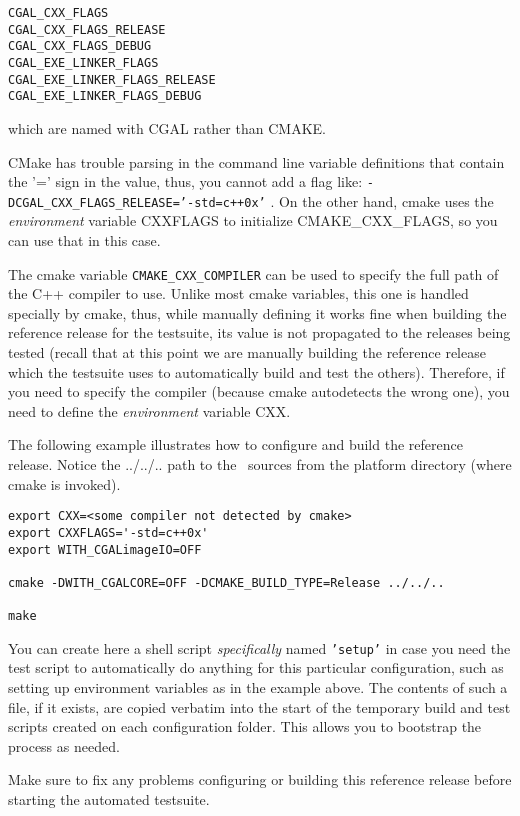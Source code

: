 \begin{verbatim}
CGAL_CXX_FLAGS
CGAL_CXX_FLAGS_RELEASE
CGAL_CXX_FLAGS_DEBUG
CGAL_EXE_LINKER_FLAGS
CGAL_EXE_LINKER_FLAGS_RELEASE
CGAL_EXE_LINKER_FLAGS_DEBUG
\end{verbatim}

which are named with CGAL rather than CMAKE.

CMake has trouble parsing in the command line variable definitions that contain the '=' sign in the value, thus,
you cannot add a flag like: {\tt -DCGAL\_CXX\_FLAGS\_RELEASE='-std=c++0x'} . On the other hand, cmake uses
the {\em environment} variable CXXFLAGS to initialize CMAKE\_CXX\_FLAGS, so you can use that in this case.

The cmake variable {\tt CMAKE\_CXX\_COMPILER} can be used to specify the full path of the C++ compiler to use.
Unlike most cmake variables, this one is handled specially by cmake, thus, while manually defining it
works fine when building the reference release for the testsuite, its value is not propagated
to the releases being tested (recall that at this point we are manually building the reference release
which the testsuite uses to automatically build and test the others). Therefore, if you need
to specify the compiler (because cmake autodetects the wrong one), you need to define the
{\em environment} variable CXX.


The following example illustrates how to configure and build the reference release.
Notice the ../../.. path to the \cgal\ sources from the platform directory (where cmake is invoked).

\begin{verbatim}
export CXX=<some compiler not detected by cmake>
export CXXFLAGS='-std=c++0x'
export WITH_CGALimageIO=OFF 

cmake -DWITH_CGALCORE=OFF -DCMAKE_BUILD_TYPE=Release ../../..

make
\end{verbatim}

You can create here a shell script {\em specifically} named {\tt 'setup'} in case you need the test script
to automatically do anything for this particular configuration, such as setting up 
environment variables as in the example above. The contents of such a file, if it exists, are copied verbatim 
into the start of the temporary build and test scripts created on each configuration folder. This allows
you to bootstrap the process as needed.

Make sure to fix any problems configuring or building this reference release before starting the automated testsuite.

